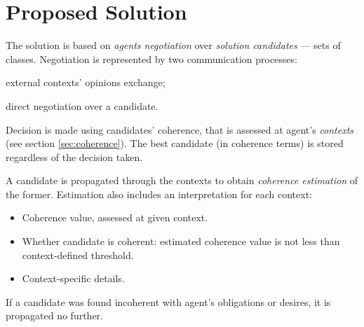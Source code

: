 \documentclass[ThesisDoc]{subfiles}
\begin{document}
\section{Proposed Solution}

The solution is based on \emph{agents negotiation} over
\emph{solution candidates} --- sets of classes. Negotiation is represented by
two communication processes:
\begin{enumerate*}[1)]
  \item external contexts' opinions exchange;
  \item direct negotiation over a candidate.
\end{enumerate*}
Decision is made using candidates' coherence, that is assessed at agent's
\emph{contexts} (see section \ref{sec:coherence}). The best candidate
(in coherence terms) is stored regardless of the decision taken.

A candidate is propagated through the contexts to obtain \emph{coherence estimation}
of the former.
Estimation also includes an interpretation for each context:
\begin{itemize}
  \item Coherence value, assessed at given context.
  \item Whether candidate is coherent: estimated coherence value is not less than
        context-defined threshold.
  \item Context-specific details.
\end{itemize}
If a candidate was found incoherent with agent's obligations or desires, it
is propagated no further.
\end{document}
